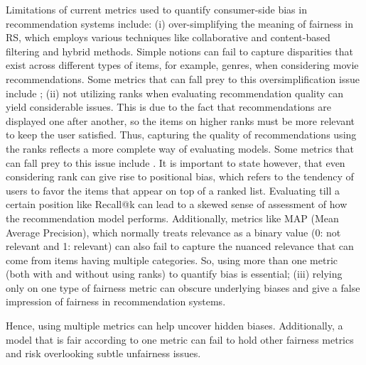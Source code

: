  
Limitations of current metrics used to quantify consumer-side bias in recommendation systems include: (i) over-simplifying the meaning of fairness in RS, which employs various techniques like collaborative and content-based filtering and hybrid methods.
Simple notions can fail to capture disparities that exist across different types of items, for example, genres, when considering movie recommendations. Some metrics that can fall prey to this oversimplification issue include \cite{Weydemann19,NIPS2017_e6384711, Fu20,10.1145/3442381.3449866,islam21,foulds2019bayesianmodelingintersectionalfairness,9101635,do2022online,10.1145/3534678.3539269,Melchiorre21,deldjoo_flexible_2021};
(ii) not utilizing ranks when evaluating recommendation quality can yield considerable issues. 
This is due to the fact that recommendations are displayed one after another, so the items on higher ranks must be more relevant to keep the user satisfied. 
Thus, capturing the quality of recommendations using the ranks reflects a more complete way of evaluating models. 
Some metrics that can fall prey to this issue include \cite{NIPS2017_e6384711,Weydemann19,do2022online,10.1145/3534678.3539269,deldjoo_flexible_2021}.
It is important to state however, that even considering rank can give rise to positional bias, which refers to the tendency of users to favor the items that appear on top of a ranked list. 
Evaluating till a certain position like Recall@k can lead to a skewed sense of assessment of how the recommendation model performs. 
Additionally, metrics like MAP (Mean Average Precision), which normally treats relevance as a binary value (0: not relevant and 1: relevant) can also fail to capture the nuanced relevance that can come from items having multiple categories. 
So, using more than one metric (both with and without using ranks) to quantify bias is essential; 
(iii) relying only on one type of fairness metric can obscure underlying biases and give a false impression of fairness in recommendation systems. 

Hence, using multiple metrics can help uncover hidden biases. Additionally, a model that is fair according to one metric can fail to hold other fairness metrics and risk overlooking subtle unfairness issues.



